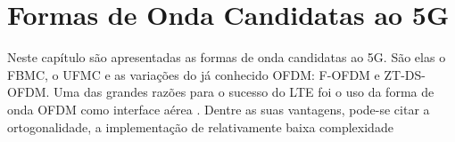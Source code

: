 \chapter{Formas de Onda Candidatas ao 5G} \label{capitulo2}

Neste capítulo são apresentadas as formas de onda candidatas ao 5G. São elas o FBMC, o UFMC e as variações do já conhecido OFDM: F-OFDM e ZT-DS-OFDM. Uma das grandes razões para o sucesso do LTE foi o uso da forma de onda OFDM como interface aérea \cite{}. Dentre as suas vantagens, pode-se citar a ortogonalidade, a implementação de relativamente baixa complexidade  


